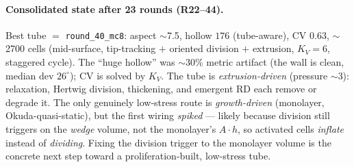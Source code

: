 \documentclass[11pt]{article}
\begin{document}
\paragraph{Consolidated state after 23 rounds (R22--44).} Best tube $=$ \texttt{round\_40\_mc8}: aspect
$\sim$7.5, hollow $176$ (tube-aware), CV $0.63$, $\sim$2700 cells (mid-surface, tip-tracking $+$ oriented
division $+$ extrusion, $K_V\!=\!6$, staggered cycle). The ``huge hollow'' was $\sim$30\% metric artifact
(the wall is clean, median dev $26^\circ$); CV is solved by $K_V$. The tube is \emph{extrusion-driven}
(pressure $\sim$3): relaxation, Hertwig division, thickening, and emergent RD each remove or degrade it. The
only genuinely low-stress route is \emph{growth-driven} (monolayer, Okuda-quasi-static), but the first wiring
\emph{spiked} --- likely because division still triggers on the \emph{wedge} volume, not the monolayer's
$A\!\cdot\!h$, so activated cells \emph{inflate} instead of \emph{dividing}. Fixing the division trigger to the
monolayer volume is the concrete next step toward a proliferation-built, low-stress tube.
\end{document}
